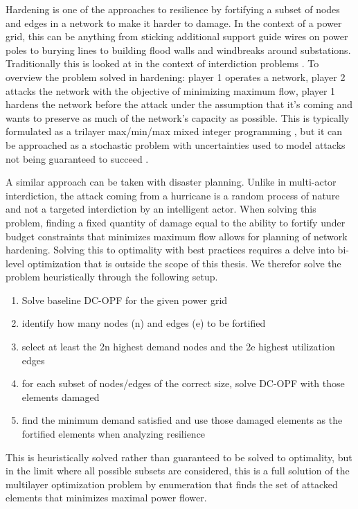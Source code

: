 \documentclass{article}
\begin{document}
	Hardening is one of the approaches to resilience by fortifying a subset of nodes and edges in a network to make it harder to damage. In the context of a power grid, this can be anything from sticking additional support guide wires on power poles to burying lines to building flood walls and windbreaks around substations. Traditionally this is looked at in the context of interdiction problems \cite{ChurchEA2007}. To overview the problem solved in hardening: player 1 operates a network, player 2 attacks the network with the objective of minimizing maximum flow, player 1 hardens the network before the attack under the assumption that it's coming and wants to preserve as much of the network's capacity as possible. This is typically formulated as a trilayer max/min/max mixed integer programming \cite{Mahmoo2016}, but it can be approached as a stochastic problem with uncertainties used to model attacks not being guaranteed to succeed \cite{Ramirez2009}.
	
	A similar approach can be taken with disaster planning. Unlike in multi-actor interdiction, the attack coming from a hurricane is a random process of nature and not a targeted interdiction by an intelligent actor. When solving this problem, finding a fixed quantity of damage equal to the ability to fortify under budget constraints that minimizes maximum flow allows for planning of network hardening. Solving this to optimality with best practices requires a delve into bi-level optimization that is outside the scope of this thesis. We therefor solve the problem heuristically through the following setup.
	
	\begin{enumerate}
		
	\item Solve baseline DC-OPF for the given power grid
	\item identify how many nodes (n) and edges (e) to be fortified
	\item select at least the 2n highest demand nodes and the 2e highest utilization edges
	\item for each subset of nodes/edges of the correct size, solve DC-OPF with those elements damaged
	\item find the minimum demand satisfied and use those damaged elements as the fortified elements when analyzing resilience 
	\end{enumerate}

	This is heuristically solved rather than guaranteed to be solved to optimality, but in the limit where all possible subsets are considered, this is a full solution of the multilayer optimization problem by enumeration that finds the set of attacked elements that minimizes maximal power flower. 
\end{document}
